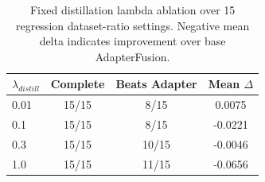 \begin{table}[t]
\centering
\small
\caption{Fixed distillation lambda ablation over 15 regression dataset-ratio settings. Negative mean delta indicates improvement over base AdapterFusion.}
\label{tab:lambda_summary}
\begin{tabular}{lccc}
\toprule
$\lambda_{distill}$ & Complete & Beats Adapter & Mean $\Delta$ \\
\midrule
0.01 & 15/15 & 8/15 & 0.0075 \\
0.1 & 15/15 & 8/15 & -0.0221 \\
0.3 & 15/15 & 10/15 & -0.0046 \\
1.0 & 15/15 & 11/15 & -0.0656 \\
\bottomrule
\end{tabular}
\end{table}
